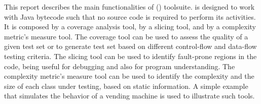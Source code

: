 
\begin{summary}

This report describes the main functionalities of \toolname
(\tooldesc) toolsuite. \toolname is designed to work with Java
bytecode such that no source code is required to perform its
activities. It is composed by a coverage analysis tool, by a
slicing tool, and by a complexity metric's measure tool. The
coverage tool can be used to assess the quality of a given test
set or to generate test set based on different control-flow and
data-flow testing criteria. The slicing tool can be used to
identify fault-prone regions in the code, being useful for
debugging and also for program understanding. The complexity
metric's measure tool can be used to identify the complexity and
the size of each class under testing, based on static information.
A simple example that simulates the behavior of a vending machine
is used to illustrate such tools.
\end{summary}
